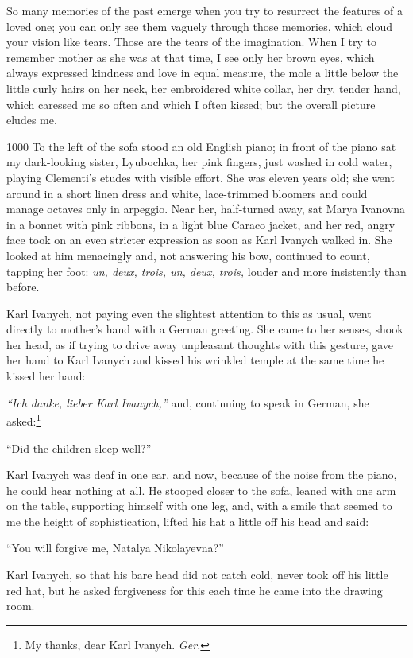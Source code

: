 So many memories of the past emerge when you try to resurrect the features of a loved one; you can only see them vaguely through those memories, which cloud your vision like tears. Those are the tears of the imagination. When I try to remember mother as she was at that time, I see only her brown eyes, which always expressed kindness and love in equal measure, the mole a little below the little curly hairs on her neck, her embroidered white collar, her dry, tender hand, which caressed me so often and which I often kissed; but the overall picture eludes me.

\begin{tolerant}{1000}
To the left of the sofa stood an old English piano; in front of the piano sat my dark-looking sister, Lyubochka, her pink fingers, just washed in cold water, playing Clementi's etudes with visible effort. She was eleven years old; she went around in a short linen dress and white, lace-trimmed bloomers and could manage octaves only in arpeggio. Near her, half-turned away, sat Marya Ivanovna in a bonnet with pink ribbons, in a light blue Caraco jacket, and her red, angry face took on an even stricter expression as soon as Karl Ivanych walked in. She looked at him menacingly and, not answering his bow, continued to count, tapping her foot: \textit{un, deux, trois, un, deux, trois,} louder and more insistently than before.
\end{tolerant}

Karl Ivanych, not paying even the slightest attention to this as usual, went directly to mother's hand with a German greeting. She came to her senses, shook her head, as if trying to drive away unpleasant thoughts with this gesture, gave her hand to Karl Ivanych and kissed his wrinkled temple at the same time he kissed her hand:

\textit{``Ich danke, lieber Karl Ivanych,''} and, continuing to speak in German, she asked:\footnote{My thanks, dear Karl Ivanych. \textit{Ger.}} %

``Did the children sleep well?'' %

Karl Ivanych was deaf in one ear, and now, because of the noise from the piano, he could hear nothing at all. He stooped closer to the sofa, leaned with one arm on the table, supporting himself with one leg, and, with a smile that seemed to me the height of sophistication, lifted his hat a little off his head and said:

``You will forgive me, Natalya Nikolayevna?'' %

Karl Ivanych, so that his bare head did not catch cold, never took off his little red hat, but he asked forgiveness for this each time he came into the drawing room.

